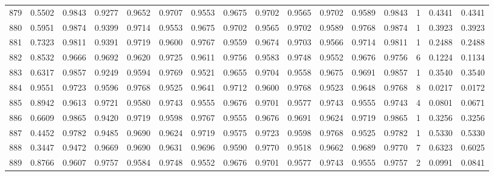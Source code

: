\begin{tabular}{lrrrrrrrrrrrrrrr}
879 &      0.5502 &  0.9843 &  0.9277 &  0.9652 &  0.9707 &  0.9553 &  0.9675 &  0.9702 &  0.9565 &  0.9702 &   0.9589 &     0.9843 &      1 &                    0.4341 &                     0.4341 \\
880 &      0.5951 &  0.9874 &  0.9399 &  0.9714 &  0.9553 &  0.9675 &  0.9702 &  0.9565 &  0.9702 &  0.9589 &   0.9768 &     0.9874 &      1 &                    0.3923 &                     0.3923 \\
881 &      0.7323 &  0.9811 &  0.9391 &  0.9719 &  0.9600 &  0.9767 &  0.9559 &  0.9674 &  0.9703 &  0.9566 &   0.9714 &     0.9811 &      1 &                    0.2488 &                     0.2488 \\
882 &      0.8532 &  0.9666 &  0.9692 &  0.9620 &  0.9725 &  0.9611 &  0.9756 &  0.9583 &  0.9748 &  0.9552 &   0.9676 &     0.9756 &      6 &                    0.1224 &                     0.1134 \\
883 &      0.6317 &  0.9857 &  0.9249 &  0.9594 &  0.9769 &  0.9521 &  0.9655 &  0.9704 &  0.9558 &  0.9675 &   0.9691 &     0.9857 &      1 &                    0.3540 &                     0.3540 \\
884 &      0.9551 &  0.9723 &  0.9596 &  0.9768 &  0.9525 &  0.9641 &  0.9712 &  0.9600 &  0.9768 &  0.9523 &   0.9648 &     0.9768 &      8 &                    0.0217 &                     0.0172 \\
885 &      0.8942 &  0.9613 &  0.9721 &  0.9580 &  0.9743 &  0.9555 &  0.9676 &  0.9701 &  0.9577 &  0.9743 &   0.9555 &     0.9743 &      4 &                    0.0801 &                     0.0671 \\
886 &      0.6609 &  0.9865 &  0.9420 &  0.9719 &  0.9598 &  0.9767 &  0.9555 &  0.9676 &  0.9691 &  0.9624 &   0.9719 &     0.9865 &      1 &                    0.3256 &                     0.3256 \\
887 &      0.4452 &  0.9782 &  0.9485 &  0.9690 &  0.9624 &  0.9719 &  0.9575 &  0.9723 &  0.9598 &  0.9768 &   0.9525 &     0.9782 &      1 &                    0.5330 &                     0.5330 \\
888 &      0.3447 &  0.9472 &  0.9669 &  0.9690 &  0.9631 &  0.9696 &  0.9590 &  0.9770 &  0.9518 &  0.9662 &   0.9689 &     0.9770 &      7 &                    0.6323 &                     0.6025 \\
889 &      0.8766 &  0.9607 &  0.9757 &  0.9584 &  0.9748 &  0.9552 &  0.9676 &  0.9701 &  0.9577 &  0.9743 &   0.9555 &     0.9757 &      2 &                    0.0991 &                     0.0841 \\

\end{tabular}
